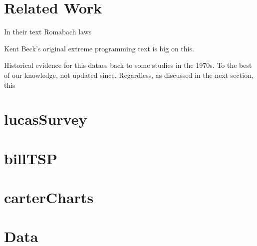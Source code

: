 \documentclass{sig-alternate}
\begin{document}
\section{Related Work}

In their text Romabach laws

Kent Beck's original extreme programming text is big on this.

Historical  evidence for this dataes back to some studies in the 1970s. To the best of
our knowledge, not updated since. Regardless, as discussed in the next section, this



\section{lucasSurvey}




\section{billTSP}

\section{carterCharts}



\section{Data}
\end{document}
